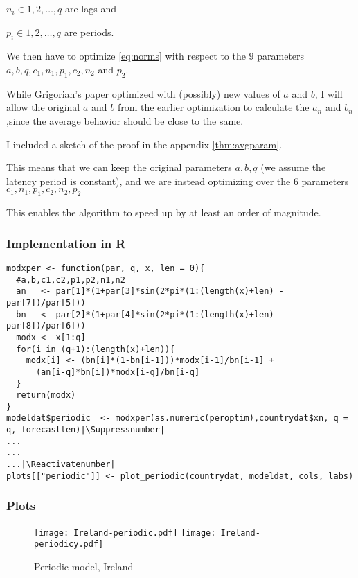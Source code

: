 $n_i  \in 1,2,\dots,q$ are lags and

$p_i  \in 1,2,\dots,q$ are periods.

We then have to optimize \ref{eq:norms} with respect to the $9$ parameters $a,b,q,c_1,n_1,p_1,c_2,n_2$ and $p_2$.

While Grigorian's paper \cite{grigor20} optimized with (possibly) new values of $a$ and $b$, I will allow the original $a$ and $b$ from the earlier optimization to calculate the $a_n$ and $b_n$,since the average behavior should be close to the same. 

I included a sketch of the proof in the appendix \ref{thm:avgparam}.

This means that we can keep the original parameters $a,b,q$ (we assume the latency period is constant), and we are instead optimizing over the $6$ parameters $c_1,n_1,p_1,c_2,n_2,p_2$

This enables the algorithm to speed up by at least an order of magnitude.

\subsubsection{Implementation in R}

\begin{lstlisting}[breaklines = true, escapeinside=||, tabsize = 4, frame=single, caption = {Algorithm for Periodic Model}]
modxper <- function(par, q, x, len = 0){
  #a,b,c1,c2,p1,p2,n1,n2
  an   <- par[1]*(1+par[3]*sin(2*pi*(1:(length(x)+len) - par[7])/par[5]))
  bn   <- par[2]*(1+par[4]*sin(2*pi*(1:(length(x)+len) - par[8])/par[6]))
  modx <- x[1:q]
  for(i in (q+1):(length(x)+len)){
    modx[i] <- (bn[i]*(1-bn[i-1]))*modx[i-1]/bn[i-1] +
      (an[i-q]*bn[i])*modx[i-q]/bn[i-q]
  }
  return(modx)
}
modeldat$periodic  <- modxper(as.numeric(peroptim),countrydat$xn, q = q, forecastlen)|\Suppressnumber|
...
...
...|\Reactivatenumber|
plots[["periodic"]] <- plot_periodic(countrydat, modeldat, cols, labs)
\end{lstlisting}

\subsubsection{Plots}

\begin{figure}[H]
  \texttt{[image: Ireland-periodic.pdf]} \label{fig:ireland-periodic}
\endminipage\hfill
{}
  \texttt{[image: Ireland-periodicy.pdf]} \label{fig:ireland-periodicy}
\endminipage
\caption{Periodic model, Ireland}
\end{figure}

